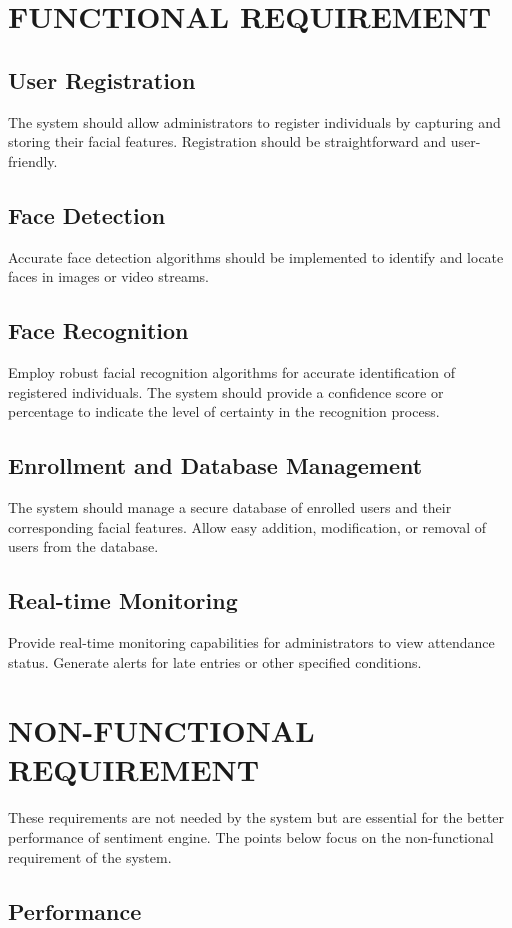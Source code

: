    \section{FUNCTIONAL REQUIREMENT}
           \subsection{User Registration}
The system should allow administrators to register individuals by capturing and storing their facial features.
Registration should be straightforward and user-friendly.
\subsection{Face Detection}
Accurate face detection algorithms should be implemented to identify and locate faces in images or video streams.
\subsection{Face Recognition}
Employ robust facial recognition algorithms for accurate identification of registered individuals.
The system should provide a confidence score or percentage to indicate the level of certainty in the recognition process.
\subsection{Enrollment and Database Management}
The system should manage a secure database of enrolled users and their corresponding facial features.
Allow easy addition, modification, or removal of users from the database.

\subsection{Real-time Monitoring}
Provide real-time monitoring capabilities for administrators to view attendance status.
Generate alerts for late entries or other specified conditions.
 \section{NON-FUNCTIONAL REQUIREMENT}
These requirements are not needed by the system but are essential for the better
performance of sentiment engine. The points below focus on the non-functional
requirement of the system.
           \subsection{Performance}
